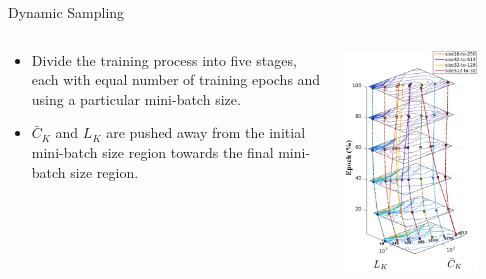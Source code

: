 \documentclass{beamer}
\begin{document}
\begin{frame}{Dynamic Sampling}
    \begin{columns}
    \begin{column}{0.45\textwidth}
        \begin{itemize}
            \item Divide the training process into five stages, each with equal number of training epochs and using a particular mini-batch size.
            \item $\bar{C}_K$ and $L_K$ are pushed away from the initial mini-batch size region towards the final mini-batch size region.
        \end{itemize}
    \end{column}
    \begin{column}{0.45\textwidth}
    \includegraphics[width=0.8\textwidth]{figs/fig_dynamic_sampling_cifar10_test.png}
    \end{column}
    \end{columns}
\end{frame}
\end{document}
